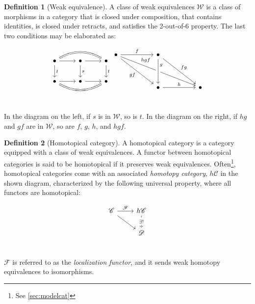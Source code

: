 \documentclass[10pt]{amsart}
\newcommand{\8}{\ensuremath{\infty}}
\newcommand{\0}{\ensuremath{\overset{\rightarrow}{0}}}
\newcommand{\1}{\ensuremath{\mathbf{1}}}
\newcommand{\C}{\ensuremath{\mathscr{C}}}
\newcommand{\D}{\ensuremath{\mathscr{D}}}
\newcommand{\F}{\ensuremath{\mathscr{F}}}
\newcommand{\Wcal}{\ensuremath{\mathcal{W}}}
\theoremstyle{definition}
\newtheorem{definition}{Definition}[section]
\numberwithin{definition}{subsection}
\numberwithin{definition}{section}
\begin{document}
\begin{definition}[Weak equivalence]
  A class of weak equivalences $\Wcal$ is a class of morphisms in a category that is closed under composition, that contains identities, is closed under retracts, and satisfies the 2-out-of-6 property. The last two conditions may be elaborated as:

  \begin{equation*}
    \begin{tikzcd}
      \bullet \arrow[d, "t"] \arrow[r] \arrow[rr, bend left, equals] & \bullet \arrow[d, "s"] \arrow[r] & \bullet \arrow[d, "t"] \\
      \bullet \arrow[r] \arrow[rr, bend right, equals] & \bullet \arrow[r] & \bullet \\
    \end{tikzcd}
    \begin{tikzcd}
      \bullet \arrow[rr, "f"] \arrow[ddrr, "gf"'] \arrow[ddrrrr, "hgf" near start] & & \bullet \arrow[dd, "g" near start, crossing over] \arrow[ddrr, "fg"] & & \\
      \\
      & & \bullet \arrow[rr, "h"] & & \bullet \\
    \end{tikzcd}
  \end{equation*}

  In the diagram on the left, if $s$ is in \Wcal, so is $t$. In the diagram on the right, if $hg$ and $gf$ are in \Wcal, so are $f$, $g$, $h$, and $hgf$.
\end{definition}

\begin{definition}[Homotopical category]
  A homotopical category is a category equipped with a class of weak equivalences. A functor between homotopical categories is said to be homotopical if it preserves weak equivalences. Often\footnote{See \ref{sec:modelcat}}, homotopical categories come with an associated \emph{homotopy category}, $h\C$ in the shown diagram, characterized by the following universal property, where all functors are homotopical:

  \begin{equation*}
    \begin{tikzcd}
      \C \arrow[r, "\F"] \arrow[dr] & h\C \arrow[d, dashed, "\exists!" description] \\
      & \D \\
    \end{tikzcd}
  \end{equation*}

  $\F$ is referred to as the \emph{localization functor}, and it sends weak homotopy equivalences to isomorphisms.
\end{definition}
\end{document}
